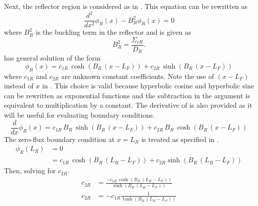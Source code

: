   Next, the reflector region is considered as in . This equation
  can be rewritten as
  \begin{equation}
    \label{eq:2regR_buckle}
    \frac{d^2}{dx^2} \phi_R(x) - B_R^2 \phi_R(x) = 0
  \end{equation}
  where $B_R^2$ is the buckling term in the reflector and is given as
  \begin{equation}
    \label{eq:2regR_b2}
    B_R^2 = \frac{\Sigma_{rR}}{D_R}.
  \end{equation}
   has general solution of the form
  \begin{equation}
    \label{eq:2regR_general}
    \phi_R(x) = c_{1R} \, \cosh(B_R\, (x-L_F)) + c_{2R} \, \sinh(B_R\,(x-L_F))
  \end{equation}
  where $c_{1R}$ and $c_{2R}$ are unknown constant coefficients.
  Note the use of $(x-L_F)$ instead of $x$ in . This
  choice is valid because hyperbolic cosine and hyperbolic sine can be rewritten
  as exponential functions and the subtraction in the argument is equivalent to
  multiplication by a constant.
  The derivative of  is also provided as it will be
  useful for evaluating boundary conditions.
  \begin{equation}
    \label{eq:2regR_general_derivative}
    \frac{d}{dx} \phi_R(x) = c_{1R} \, B_R \, \sinh(B_R \, (x-L_F)) + 
      c_{2R} \, B_R \, \cosh(B_R \, (x-L_F))
  \end{equation}
  The zero-flux boundary condition at $x=L_R$ is treated as specified in
  .
  \begin{align}
    \phi_R(L_R) &= 0 \\
    &= c_{1R} \, \cosh(B_R \, (L_R - L_F)) + c_{2R} \sinh(B_R \, (L_R-L_F))
  \end{align}
  Then, solving for $c_{2R}$.
  \begin{align}
    c_{2R} &= \frac{-c_{1R}\,\cosh(B_R\,(L_R - L_F))}{\sinh(B_R \,(L_R-L_F))} \\
    \label{eq:2reg_c2r_a}
    c_{2R} &= -c_{1R} \frac{1}{\tanh(B_R\,(L_R-L_F))}
  \end{align}

